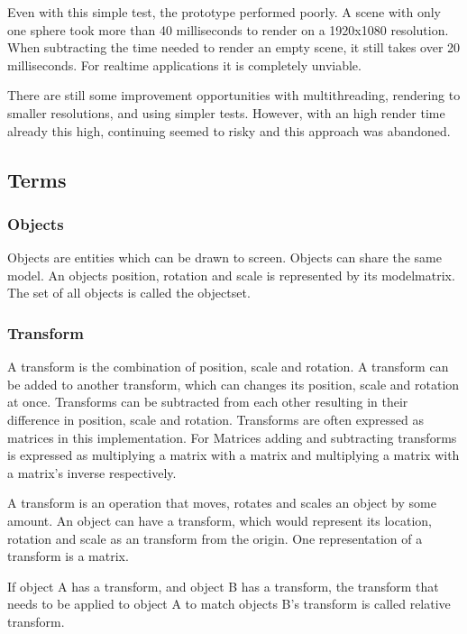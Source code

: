 Even with this simple test, the prototype performed poorly. A scene with only one sphere took more than 40 milliseconds to render on a 1920x1080 resolution. When subtracting the time needed to render an empty scene, it still takes over 20 milliseconds. For realtime applications it is completely unviable.

There are still some improvement opportunities with multithreading, rendering to smaller resolutions, and using simpler tests. However, with an high render time already this high, continuing seemed to risky and this approach was abandoned.





\subsection{Terms}
\subsubsection{Objects}
Objects are entities which can be drawn to screen. Objects can share the same model. An objects position, rotation and scale is represented by its \gls{modelmatrix}. The set of all objects is called the \gls{objectset}.

\subsubsection{Transform}
A transform is the combination of position, scale and rotation. A transform can be added to another transform, which can changes its position, scale and rotation at once. Transforms can be subtracted from each other resulting in their difference in position, scale and rotation. Transforms are often expressed as matrices in this implementation. For Matrices adding and subtracting transforms is expressed as multiplying a matrix with a matrix and multiplying a matrix with a matrix's inverse respectively.


A transform is an operation that moves, rotates and scales an object by some amount. An object can have a transform, which would represent its location, rotation and scale as an transform from the origin. One representation of a transform is a matrix.

If object A has a transform, and object B has a transform, the transform that needs to be applied to object A to match objects B's transform is called relative transform.



